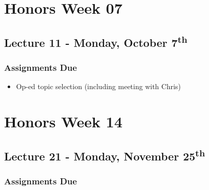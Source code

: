 \documentclass[]{book}
\providecommand{\tightlist}{%
  \setlength{\itemsep}{0pt}\setlength{\parskip}{0pt}}
\begin{document}
\hypertarget{honors-week-07}{%
\section*{Honors Week 07}\label{honors-week-07}}

\hypertarget{lecture-11---monday-october-7th-1}{%
\subsection*{\texorpdfstring{Lecture 11 - Monday, October 7\textsuperscript{th}}{Lecture 11 - Monday, October 7th}}\label{lecture-11---monday-october-7th-1}}

\hypertarget{assignments-due-7}{%
\subsubsection*{Assignments Due}\label{assignments-due-7}}

\begin{itemize}
\tightlist
\item
  Op-ed topic selection (including meeting with Chris)
\end{itemize}

\hypertarget{honors-week-14}{%
\section*{Honors Week 14}\label{honors-week-14}}

\hypertarget{lecture-21---monday-november-25th-1}{%
\subsection*{\texorpdfstring{Lecture 21 - Monday, November 25\textsuperscript{th}}{Lecture 21 - Monday, November 25th}}\label{lecture-21---monday-november-25th-1}}

\hypertarget{assignments-due-8}{%
\subsubsection*{Assignments Due}\label{assignments-due-8}}
\end{document}
